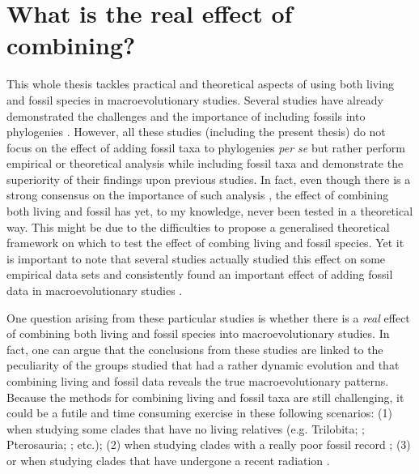 \section{What is the real effect of combining?}
This whole thesis tackles practical and theoretical aspects of using both living and fossil species in macroevolutionary studies.
Several studies have already demonstrated the challenges and the importance of including fossils into phylogenies \citep[e.g.][]{ronquista2012,slaterphylogenetic2013,Wood01032013,beckancient2014,Dembo2015}.
However, all these studies (including the present thesis) do not focus on the effect of adding fossil taxa to phylogenies \textit{per se} but rather perform empirical or theoretical analysis while including fossil taxa and demonstrate the superiority of their findings upon previous studies.
In fact, even though there is a strong consensus on the importance of such analysis \citep{jacksonwhat2006,quentaldiversity2010,dietlconservation2011,slaterunifying2013,fritzdiversity2013,benton2015}, the effect of combining both living and fossil has yet, to my knowledge, never been tested in a theoretical way.
This might be due to the difficulties to propose a generalised theoretical framework on which to test the effect of combing living and fossil species.
Yet it is important to note that several studies actually studied this effect on some empirical data sets and consistently found an important effect of adding fossil data in macroevolutionary studies \citep{Finarelli2006,Slateretal2012,slaterphylogenetic2013,SlaterPennel2014,pant2014complex,Mitchell2015}.

One question arising from these particular studies is whether there is a \textit{real} effect of combining both living and fossil species into macroevolutionary studies.
In fact, one can argue that the conclusions from these studies are linked to the peculiarity of the groups studied that had a rather dynamic evolution and that combining living and fossil data reveals the true macroevolutionary patterns.
Because the methods for combining living and fossil taxa are still challenging, it could be a futile and time consuming exercise in these following scenarios: (1) when studying some clades that have no living relatives (e.g. Trilobita; \citealt{hopkinsdecoupling2013}; Pterosauria; \citealt{Butler2012}; etc.); (2) when studying clades with a really poor fossil record \citep[e.g. Aves where there are three orders of magnitude more known living than fossil taxa;][]{jetzthe2012,Mitchell2015}; (3) or when studying clades that have undergone a recent radiation \citep[e.g. Cichlidae][]{Genner01052007}.

